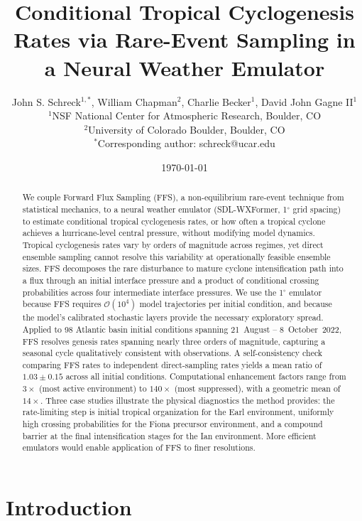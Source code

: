 \documentclass[11pt]{article}
\title{Conditional Tropical Cyclogenesis Rates via Rare-Event Sampling in a Neural Weather Emulator}
\author{%
  John S. Schreck$^{1,*}$,
  William Chapman$^{2}$, 
  Charlie Becker$^{1}$,
  David John Gagne II$^{1}$ \\
  \small $^1$NSF National Center for Atmospheric Research, Boulder, CO \\
  \small $^2$University of Colorado Boulder, Boulder, CO \\
  \small $^*$Corresponding author: schreck@ucar.edu
}
\date{\today}
\begin{document}
\maketitle

\begin{abstract}
We couple Forward Flux Sampling (FFS), a non-equilibrium rare-event technique from statistical mechanics, to a neural weather emulator (SDL-WXFormer, 1$^\circ$ grid spacing) to estimate conditional tropical cyclogenesis rates, or how often a tropical cyclone achieves a hurricane-level central pressure, without modifying model dynamics. Tropical cyclogenesis rates vary by orders of magnitude across regimes, yet direct ensemble sampling cannot resolve this variability at operationally feasible ensemble sizes. FFS decomposes the rare disturbance to mature cyclone intensification path into a flux through an initial interface pressure and a product of conditional crossing probabilities across four intermediate  interface pressures. We use the 1$^\circ$ emulator because FFS requires $\mathcal{O}(10^4)$ model trajectories per initial condition, and because the model's calibrated stochastic layers provide the necessary exploratory spread. Applied to 98 Atlantic basin initial conditions spanning 21~August -- 8~October~2022, FFS resolves genesis rates spanning nearly three orders of magnitude, capturing a  seasonal cycle qualitatively consistent with observations. A self-consistency check comparing FFS rates to independent direct-sampling rates yields a mean ratio of $1.03 \pm 0.15$ across all initial conditions. Computational enhancement factors range from $3\times$ (most active environment) to $140\times$ (most suppressed), with a geometric mean of $14\times$. Three case studies illustrate the physical diagnostics the method provides: the rate-limiting step is initial tropical organization for the Earl environment, uniformly high crossing probabilities for the Fiona precursor environment, and a compound barrier at the final intensification stages for the Ian environment. More efficient emulators would enable application of FFS to finer resolutions.
\end{abstract}

\section{Introduction}
\end{document}
